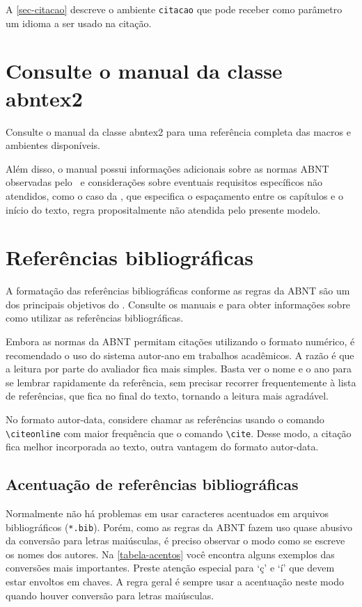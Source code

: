 A \cref{sec-citacao} descreve o ambiente \texttt{citacao} que pode receber como parâmetro um idioma a ser usado na citação.

\section{Consulte o manual da classe \textsf{abntex2}}

Consulte o manual da classe \textsf{abntex2} \cite{abntex2classe} para uma referência completa das macros e ambientes disponíveis. 

Além disso, o manual possui informações adicionais sobre as normas ABNT observadas pelo \abnTeX\ e considerações sobre eventuais requisitos específicos não atendidos, como o caso da , que especifica o espaçamento entre os capítulos e o início do texto, regra propositalmente não atendida pelo presente modelo.

\section{Referências bibliográficas}

A formatação das referências bibliográficas conforme as regras da ABNT são um dos principais objetivos do \abnTeX. Consulte os manuais  e  para obter informações sobre como utilizar as referências bibliográficas.

Embora as normas da ABNT permitam citações utilizando o formato numérico, é recomendado o uso do sistema autor-ano em trabalhos acadêmicos. A razão é que a leitura por parte do avaliador fica mais simples. Basta ver o nome e o ano para se lembrar rapidamente da referência, sem precisar recorrer frequentemente à lista de referências, que fica no final do texto, tornando a leitura mais agradável.

No formato autor-data, considere chamar as referências usando o comando \verb|\citeonline| com maior frequência que o comando \verb|\cite|. Desse modo, a citação fica melhor incorporada ao texto, outra vantagem do formato autor-data.

\subsection{Acentuação de referências bibliográficas}

Normalmente não há problemas em usar caracteres acentuados em arquivos
bibliográficos (\texttt{*.bib}). Porém, como as regras da ABNT fazem uso quase
abusivo da conversão para letras maiúsculas, é preciso observar o modo como se
escreve os nomes dos autores. Na \cref{tabela-acentos} você encontra alguns
exemplos das conversões mais importantes. Preste atenção especial para `ç' e `í'
que devem estar envoltos em chaves. A regra geral é sempre usar a acentuação
neste modo quando houver conversão para letras maiúsculas.

